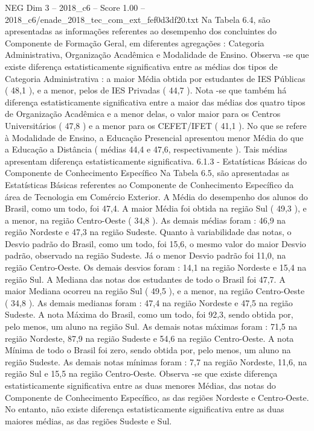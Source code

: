 \begin{textsample}{NEG Dim 3 – 2018\_c6 – Score 1.00 – 2018\_c6/enade\_2018\_tec\_com\_ext\_fef0d3df20.txt}
Na Tabela 6.4, são apresentadas as informações referentes ao desempenho dos concluintes do Componente de Formação Geral, em diferentes agregações : Categoria Administrativa, Organização Acadêmica e Modalidade de Ensino.
Observa -se que existe diferença estatisticamente significativa entre as médias dos tipos de Categoria Administrativa : a maior Média obtida por estudantes de IES Públicas ( 48,1 ), e a menor, pelos de IES Privadas ( 44,7 ).
Nota -se que também há diferença estatisticamente significativa entre a maior das médias dos quatro tipos de Organização Acadêmica e a menor delas, o valor maior para os Centros Universitários ( 47,8 ) e a menor para os CEFET/IFET ( 41,1 ).
No que se refere à Modalidade de Ensino, a Educação Presencial apresentou menor Média do que a Educação a Distância ( médias 44,4 e 47,6, respectivamente ).
Tais médias apresentam diferença estatisticamente significativa. 6.1.3 - Estatísticas Básicas do Componente de Conhecimento Específico Na Tabela 6.5, são apresentadas as Estatísticas Básicas referentes ao Componente de Conhecimento Específico da área de Tecnologia em Comércio Exterior.
A Média do desempenho dos alunos do Brasil, como um todo, foi 47,4.
A maior Média foi obtida na região Sul ( 49,3 ), e a menor, na região Centro-Oeste ( 34,8 ).
As demais médias foram : 46,9 na região Nordeste e 47,3 na região Sudeste.
Quanto à variabilidade das notas, o Desvio padrão do Brasil, como um todo, foi 15,6, o mesmo valor do maior Desvio padrão, observado na região Sudeste.
Já o menor Desvio padrão foi 11,0, na região Centro-Oeste.
Os demais desvios foram : 14,1 na região Nordeste e 15,4 na região Sul.
A Mediana das notas dos estudantes de todo o Brasil foi 47,7.
A maior Mediana ocorreu na região Sul ( 49,5 ), e a menor, na região Centro-Oeste ( 34,8 ).
As demais medianas foram : 47,4 na região Nordeste e 47,5 na região Sudeste.
A nota Máxima do Brasil, como um todo, foi 92,3, sendo obtida por, pelo menos, um aluno na região Sul.
As demais notas máximas foram : 71,5 na região Nordeste, 87,9 na região Sudeste e 54,6 na região Centro-Oeste.
A nota Mínima de todo o Brasil foi zero, sendo obtida por, pelo menos, um aluno na região Sudeste.
As demais notas mínimas foram : 7,7 na região Nordeste, 11,6, na região Sul e 15,5 na região Centro-Oeste.
Observa -se que existe diferença estatisticamente significativa entre as duas menores Médias, das notas do Componente de Conhecimento Específico, as das regiões Nordeste e Centro-Oeste.
No entanto, não existe diferença estatisticamente significativa entre as duas maiores médias, as das regiões Sudeste e Sul.

\end{textsample}

